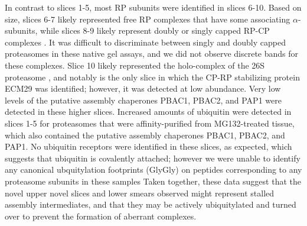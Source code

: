 In contrast to slices 1-5, most RP subunits were identified in slices 6-10. Based on size, slices 6-7 likely represented free RP complexes that have some associating $\alpha$-subunits, while slices 8-9 likely represent doubly or singly capped RP-CP complexes \citep{book10}. It was difficult to discriminate between singly and doubly capped proteasomes in these native gel assays, and we did not observe discrete bands for these complexes. Slice 10 likely represented the holo-complex of the 26S proteasome \citep{book10}, and notably is the only slice in which the CP-RP stabilizing protein ECM29 was identified; however, it was detected at low abundance. Very low levels of the putative assembly chaperones PBAC1, PBAC2, and PAP1 were detected in these higher slices. Increased amounts of ubiquitin were detected in slices 1-5 for proteasomes that were affinity-purified from MG132-treated tissue, which also contained the putative assembly chaperones PBAC1, PBAC2, and PAP1. No ubiquitin receptors were identified in these slices, as expected, which suggests that ubiquitin is covalently attached; however we were unable to identify any canonical ubquitylation footprints (GlyGly) \citep{wang06} on peptides corresponding to any proteasome subunits in these samples  Taken together, these data suggest that the novel upper novel slices and lower smears observed might represent stalled assembly intermediates, and that they may be actively ubiquitylated and turned over to prevent the formation of aberrant complexes.
 
